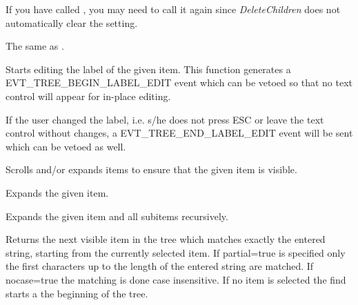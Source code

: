 If you have called , you
may need to call it again since {\it DeleteChildren} does not automatically
clear the setting.

\label{wxtreelistctrledit}


The same as .

\label{wxtreelistctrleditlabel}


Starts editing the label of the given item. This function generates a
EVT\_TREE\_BEGIN\_LABEL\_EDIT event which can be vetoed so that no
text control will appear for in-place editing.

If the user changed the label, i.e. s/he does not press ESC or leave
the text control without changes, a EVT\_TREE\_END\_LABEL\_EDIT event
will be sent which can be vetoed as well.



\label{wxtreelistctrlensurevisible}


Scrolls and/or expands items to ensure that the given item is visible.

\label{wxtreelistctrlexpand}


Expands the given item.

\label{wxtreelistctrlexpandall}


Expands the given item and all subitems recursively.

\label{wxtreelistctrlfinditem}


Returns the next visible item in the tree which matches exactly the entered string, starting 
from the currently selected item. If partial=true is specified only the first characters 
up to the length of the entered string are matched. If nocase=true the matching is done case 
insensitive. If no item is selected the find starts a the beginning of the tree.

